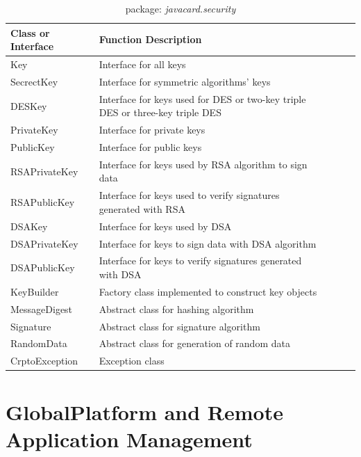 \begin{table}[ht]
\caption{package: \emph{javacard.security}}
\centering
\begin{tabular}{lllll}
\hline
 Class or Interface & Function Description\\
\hline\hline
 Key &Interface for all keys   \\
 SecrectKey &Interface for symmetric algorithms' keys\\
DESKey & \parbox[t]{10cm}{Interface for keys used for DES or two-key triple DES or three-key triple DES}\\
PrivateKey &Interface for private keys\\
PublicKey & Interface for public keys\\
RSAPrivateKey& Interface for keys used by RSA algorithm to sign data\\
RSAPublicKey & Interface for keys used to verify signatures generated with RSA \\
DSAKey& Interface for keys used by DSA\\ 
DSAPrivateKey& Interface for keys to sign data with DSA algorithm\\
DSAPublicKey& Interface for keys to verify signatures generated with DSA\\
KeyBuilder& Factory class implemented to construct key objects\\
MessageDigest& Abstract class for hashing algorithm\\
Signature& Abstract class for signature algorithm\\
RandomData&Abstract class for generation of random data \\
CrptoException& Exception class\\
\hline
\end{tabular}
\label{table:javacard-security}
\end{table}


\section{GlobalPlatform and Remote Application Management}\label{secGP}

